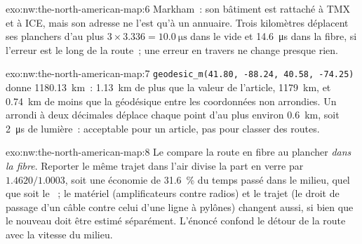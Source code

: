\begin{solution}{exo:nw:the-north-american-map:6}
Markham~: son bâtiment est rattaché à TMX et à ICE, mais son adresse ne l'est qu'à un annuaire. Trois kilomètres déplacent ses planchers d'au plus
$3 \times 3.336 = \qty{10.0}{\micro\second}$ dans le vide et \qty{14.6}{\micro\second} dans la fibre, si l'erreur est le long de la route~; une erreur
en travers ne change presque rien.
\end{solution}

\begin{solution}{exo:nw:the-north-american-map:7}
\texttt{geodesic\_m(41.80, -88.24, 40.58, -74.25)} donne \qty{1180.13}{\kilo\metre}~: \qty{1.13}{\kilo\metre} de plus que la valeur
de l'article, \qty{1179}{\kilo\metre}, et \qty{0.74}{\kilo\metre} de moins que la géodésique entre les coordonnées non arrondies. Un arrondi à deux décimales déplace chaque
point d'au plus environ \qty{0.6}{\kilo\metre}, soit \qty{2}{\micro\second} de lumière~: acceptable pour un article, pas pour classer des routes.
\end{solution}

\begin{solution}{exo:nw:the-north-american-map:8}
Le  compare la route en fibre au plancher \emph{dans la fibre}. Reporter le même trajet dans l'air divise la part en verre par
$1.4620/1.0003$, soit une économie de 31.6~\% du temps passé dans le milieu, quel que soit le ~; le matériel (amplificateurs contre radios) et le
trajet (le droit de passage d'un câble contre celui d'une ligne à pylônes) changent aussi, si bien que le nouveau  doit être estimé séparément. L'énoncé confond le
détour de la route avec la vitesse du milieu.
\end{solution}

